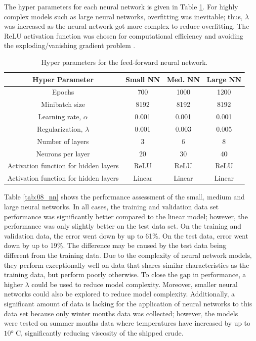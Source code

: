 The hyper parameters for each neural network is given in Table \ref{tab:08NN_hp}. For highly complex models such as large neural networks, overfitting was inevitable; thus, $\lambda$ was increased as the neural network got more complex to reduce overfitting.  The ReLU activation function was chosen for computational efficiency and avoiding the exploding/vanishing gradient problem \cite{ReLU}.
\begin{table}[h]
    \centering
    {
    \begin{tabular}{ c | c | c | c}
        Hyper Parameter                            &  Small NN  &  Med. NN  & Large NN       \\
        \hline
        Epochs                                     &  700       & 1000      & 1200  \\
        Minibatch size                             &  8192      & 8192      & 8192  \\
        Learning rate, $\alpha$                    &  0.001     & 0.001     & 0.001 \\
        Regularization, $\lambda$                  &  0.001     & 0.003     & 0.005 \\
        Number of layers                           &  3         & 6         & 8     \\
        Neurons per layer                          &  20        & 30        & 40    \\
        Activation function for hidden layers      & ReLU       & ReLU      & ReLU  \\
        Activation function for hidden layers      & Linear     & Linear    & Linear \\
    \end{tabular}}
    \caption{Hyper parameters for the feed-forward neural network.}
    \label{tab:08NN_hp}
\end{table}

Table \ref{tab:08_nn} shows the performance assessment of the small, medium and large neural networks.  In all cases, the training and validation data set performance was significantly better compared to the linear model; however, the performance was only slightly better on the test data set. On the training and validation data, the error went down by up to 61\%.  On the test data, error went down by up to 19\%. The difference may be caused by the test data being different from the training data.  Due to the complexity of neural network models, they perform exceptionally well on data that shares similar characteristics as the training data, but perform poorly otherwise. To close the gap in performance, a higher $\lambda$ could be used to reduce model complexity.  Moreover, smaller neural networks could also be explored to reduce model complexity. Additionally, a significant amount of data is lacking for the application of neural networks to this data set because only winter months data was collected; however, the models were tested on summer months data where temperatures have increased by up to $\ang{10}$ C, significantly reducing viscosity of the shipped crude.

